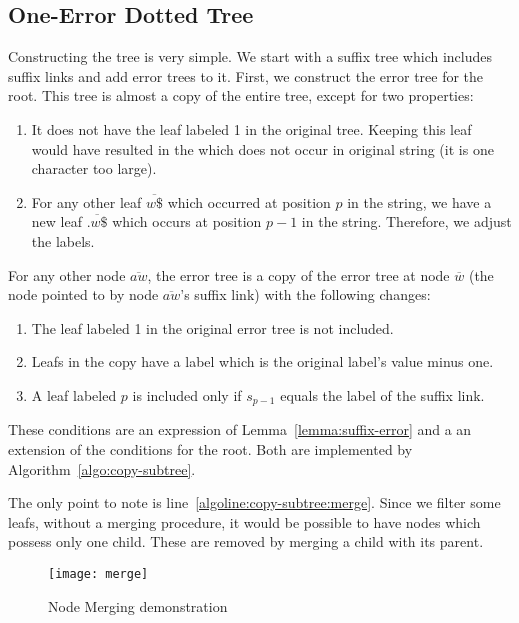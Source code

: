 \subsection{One-Error Dotted Tree}

Constructing the tree is very simple. We start with a suffix tree which includes suffix links and add error trees to it. First, we construct the error tree for the root. This tree is almost a copy of the entire tree, except for two properties:

\begin{enumerate}
\item It does not have the leaf labeled 1 in the original tree. Keeping this leaf would have resulted in the  which does not occur in original string (it is one character too large).
\item For any other leaf $\overline{w\$}$ which occurred at position $p$ in the string, we have a new leaf $\overline{.w\$}$ which occurs at position $p-1$ in the string. Therefore, we adjust the labels.

\end{enumerate}

For any other node $\overline{aw}$, the error tree is a copy of the error tree at node $\overline{w}$ (the node pointed to by node $\overline{aw}$'s suffix link) with the following changes:

\begin{enumerate}
\item The leaf labeled 1 in the original error tree is not included.
\item Leafs in the copy have a label which is the original label's value minus one.
\item A leaf labeled $p$ is included only if $s_{p-1}$ equals the label of the suffix link.
\end{enumerate}

These conditions are an expression of Lemma~\ref{lemma:suffix-error} and a an extension of the conditions for the root. Both are implemented by Algorithm~\ref{algo:copy-subtree}.



The only point to note is line~\ref{algoline:copy-subtree:merge}. Since we filter some leafs, without a merging procedure, it would be possible to have nodes which possess only one child. These are removed by merging a child with its parent.

\begin{figure}
\centering
\texttt{[image: merge]}
\caption{Node Merging demonstration}%
\label{fig:merge}
\end{figure}

